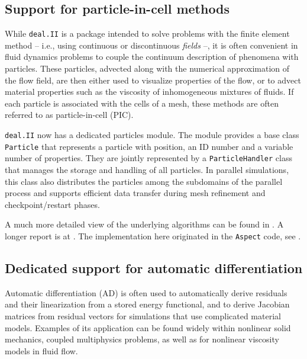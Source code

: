 \documentclass{ansarticle-preprint}
\newcommand{\specialword}[1]{\texttt{#1}}
\newcommand{\dealii}{{\specialword{deal.II}}\xspace}
\newcommand{\aspect}{\specialword{Aspect}\xspace}
\begin{document}
\subsection{Support for particle-in-cell methods}

While \dealii is a package intended to solve problems with the
finite element method -- i.e., using continuous or discontinuous
\textit{fields} --, it is often convenient in fluid dynamics problems to
couple the continuum description of phenomena with particles. These
particles, advected along with the numerical approximation of the flow
field, are then either used to visualize properties of the flow, or to
advect material properties such as the viscosity of inhomogeneous
mixtures of fluids. If each particle is associated with the cells
of a mesh, these methods are often referred to as particle-in-cell (PIC).

\dealii now has a dedicated particles module. The module provides a base class
\texttt{Particle} that represents a particle with position, an ID number and
a variable number of properties. They are jointly represented by a \texttt{ParticleHandler}
class that manages the storage and handling of all particles. In
parallel simulations, this class also
distributes the particles among the subdomains of the parallel process
and supports efficient data transfer during mesh refinement and
checkpoint/restart phases.

A much more detailed view of the underlying algorithms can be found in
\cite{GLHPB18}. A longer report is at \cite{GHPB16}. The
implementation here originated in the \aspect code, see \cite{KHB12,HDGB17}.


\subsection{Dedicated support for automatic differentiation}

Automatic differentiation (AD) is often used to automatically derive
residuals and their linearization from a stored energy functional, and to
derive Jacobian matrices from residual vectors for simulations that use
complicated material models. Examples of its application can be found widely
within nonlinear solid mechanics, coupled multiphysics problems, as well as
for nonlinear viscosity models in fluid flow.
\end{document}
